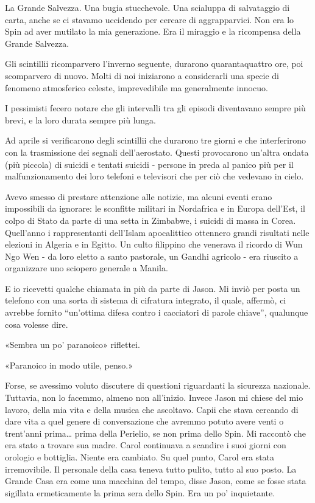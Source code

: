La Grande Salvezza. Una bugia stucchevole. Una scialuppa di salvataggio
di carta, anche se ci stavamo uccidendo per cercare di aggrapparvici.
Non era lo Spin ad aver mutilato la mia generazione. Era il miraggio e
la ricompensa della Grande Salvezza.

\separatorefiori

Gli scintillii ricomparvero l'inverno seguente, durarono quarantaquattro
ore, poi scomparvero di nuovo. Molti di noi iniziarono a considerarli
una specie di fenomeno atmosferico celeste, imprevedibile ma
generalmente innocuo.

I pessimisti fecero notare che gli intervalli tra gli episodi
diventavano sempre più brevi, e la loro durata sempre più lunga.

Ad aprile si verificarono degli scintillii che durarono tre giorni e che
interferirono con la trasmissione dei segnali dell'aerostato. Questi
provocarono un'altra ondata (più piccola) di suicidi e tentati suicidi -
persone in preda al panico più per il malfunzionamento dei loro telefoni
e televisori che per ciò che vedevano in cielo.

Avevo smesso di prestare attenzione alle notizie, ma alcuni eventi erano
impossibili da ignorare: le sconfitte militari in Nordafrica e in Europa
dell'Est, il colpo di Stato da parte di una setta in Zimbabwe, i suicidi
di massa in Corea. Quell'anno i rappresentanti dell'Islam apocalittico
ottennero grandi risultati nelle elezioni in Algeria e in Egitto. Un
culto filippino che venerava il ricordo di Wun Ngo Wen - da loro eletto
a santo pastorale, un Gandhi agricolo - era riuscito a organizzare uno
sciopero generale a Manila.

E io ricevetti qualche chiamata in più da parte di Jason. Mi inviò per
posta un telefono con una sorta di sistema di cifratura integrato, il
quale, affermò, ci avrebbe fornito ``un'ottima difesa contro i
cacciatori di parole chiave'', qualunque cosa volesse dire.

«Sembra un po' paranoico» riflettei.

«Paranoico in modo utile, penso.»

Forse, se avessimo voluto discutere di questioni riguardanti la
sicurezza nazionale. Tuttavia, non lo facemmo, almeno non all'inizio.
Invece Jason mi chiese del mio lavoro, della mia vita e della musica che
ascoltavo. Capii che stava cercando di dare vita a quel genere di
conversazione che avremmo potuto avere venti o trent'anni prima\ldots{}
prima della Perielio, se non prima dello Spin. Mi raccontò che era stato
a trovare sua madre. Carol continuava a scandire i suoi giorni con
orologio e bottiglia. Niente era cambiato. Su quel punto, Carol era
stata irremovibile. Il personale della casa teneva tutto pulito, tutto
al suo posto. La Grande Casa era come una macchina del tempo, disse
Jason, come se fosse stata sigillata ermeticamente la prima sera dello
Spin. Era un po' inquietante.

